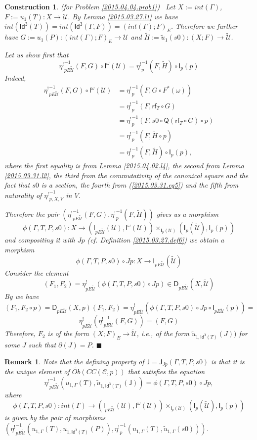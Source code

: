 \documentclass[12pt]{article}
\numberwithin{equation}{section}
\newtheorem{remark}[proposition]{Remark}
\newtheorem{construction0}[proposition]{Construction}
\newenvironment{construction}[1]{\begin{construction0}(for Problem \ref{#1})\ }{$\blacksquare$ \end{construction0}}
\newcommand{\llabel}[1]{\label{#1}}
\newcommand{\sr}{\rightarrow}
\newcommand{\wt}{\widetilde}
\newcommand{\toCC}{CC} %
\newcommand{\Idx}{\mathsf{Id^3}} %
\newcommand{\J}{\mathsf{J}}
\newcommand{\U}{\mathcal{U}}
\newcommand{\D}{\mathsf{D}}
\newcommand{\I}{\mathsf{I}}
\newcommand{\rf}{\mathsf{rf}}
\newcommand{\Q}{\mathsf{Q}}
\newcommand{\etashriek}{\eta^!}
\newcommand{\etaunshriek}{{\etashriek}^{-1}}
\begin{document}
\begin{construction}{2015.04.04.prob1}\rm
\llabel{2015.04.04.constr1} Let $X:=int(\Gamma)$, $F:=u_1(T):X\sr \U$. By Lemma
\ref{2015.03.27.l1} we have
$int(\Idx(T))=int(\Idx(\Gamma,F))=(int(\Gamma);F)_{E}$. Therefore we further
have $G:=u_1(P):(int(\Gamma);F)_{E}\sr \U$ and $\wt{H}:=\wt{u}_1(s0):(X;F)\sr
\wt{\U}$.

Let us show first that
%
$$\etaunshriek_{pE\wt{\U}}(F,G)\circ \I^{\omega}(\U)=\etaunshriek_p(F,\wt{H})\circ \I_p(p)$$
%
Indeed,
%
\begin{align*}
  \etaunshriek_{pE\wt{\U}}(F,G)\circ \I^{\omega}(\U)
    & = \etaunshriek_p(F,G\circ F^*(\omega)) \\
    & = \etaunshriek_p(F,\rf_T\circ G) \\
    & = \etaunshriek_p(F,s0\circ \Q(\rf_T\circ G)\circ p) \\
    & = \etaunshriek_p(F,\wt{H}\circ p) \\
    & = \etaunshriek_p(F,\wt{H})\circ \I_p(p),
\end{align*}
%
where the first equality is from Lemma \ref{2015.04.02.l4}, the second from
Lemma \ref{2015.03.31.l2}, the third from the commutativity of the canonical
square and the fact that $s0$ is a section, the fourth from
(\ref{2015.03.31.eq5}) and the fifth from naturality of $\etaunshriek_{p,X,V}$ in $V$.

Therefore the pair $(\etaunshriek_{pE\wt{\U}}(F,G),\etaunshriek_p(F,\wt{H}))$ gives us a
morphism
%
$$\phi(\Gamma,T,P,s0):X\sr (\I_{pE\wt{\U}}(\U), \I^{\omega}(\U)) \times_{\I_p(\U)}
(\I_p(\wt{\U}),\I_p(p))$$
%
and compositing it with $Jp$ (cf. Definition \ref{2015.03.27.def6}) we obtain a
morphism
%
$$\phi(\Gamma,T,P,s0)\circ Jp: X\sr \I_{pE\wt{\U}}(\wt{\U})$$
%
Consider the element
%
$$(F_1,F_2)=\etashriek_{pE\wt{\U}}(\phi(\Gamma,T,P,s0)\circ Jp)\in
\D_{pE\wt{\U}}(X,\wt{\U})$$
%
By \cite[Problem 3.8(1)]{fromunivwithPi} we have
%
$$(F_1,F_2\circ
p)=\D_{pE\wt{\U}}(X,p)(F_1,F_2)=\etashriek_{pE\wt{\U}}(\phi(\Gamma,T,P,s0)\circ
Jp\circ \I_{pE\wt{\U}}(p))=$$
%
$$\etashriek_{pE\wt{\U}}(\etaunshriek_{pE\wt{\U}}(F,G))=(F,G)$$
%
Therefore, $F_2$ is of the form $(X;F)_E\sr \wt{\U}$, i.e., of the form
$\wt{u}_{1,\Idx(T)}(J))$ for some $J$ such that $\partial(J)=P$.
\end{construction}
%
\begin{remark}\rm
\llabel{2015.05.08.rem1} Note that the defining property of
$\J=\J_{Jp}(\Gamma,T,P,s0)$ is that it is the unique element of
$\wt{Ob}(\toCC({\mathcal C},p))$ that satisfies the equation
%
$$\etaunshriek_{pE\wt{\U}}(u_{1,\Gamma}(T),\wt{u}_{1,\Idx(T)}(\J))=\phi(\Gamma,T,P,s0)\circ
Jp,$$
%
where
%
$$\phi(\Gamma,T,P,s0):int(\Gamma)\sr
(\I_{pE\wt{\U}}(\U),\I^{\omega}(\U))\times_{\I_p(\U)}(\I_p(\wt{\U}),\I_p(p))$$
%
is given by the pair of morphisms $(\etaunshriek_{pE\wt{\U}}(u_{1,\Gamma}(T),
u_{1,\Idx(T)}(P)), \etaunshriek_p(u_{1,\Gamma}(T),\wt{u}_{1,\Gamma}(s0)))$.
\end{remark}
%
\end{document}
